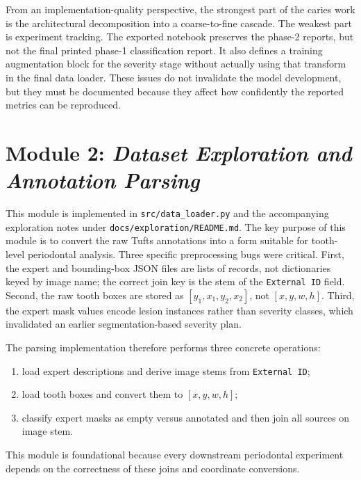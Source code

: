 From an implementation-quality perspective, the strongest part of the caries
work is the architectural decomposition into a coarse-to-fine cascade. The
weakest part is experiment tracking. The exported notebook preserves the phase-2
reports, but not the final printed phase-1 classification report. It also
defines a training augmentation block for the severity stage without actually
using that transform in the final data loader. These issues do not invalidate
the model development, but they must be documented because they affect how
confidently the reported metrics can be reproduced.


\section{Module 2: \textit{Dataset Exploration and Annotation Parsing}}
\label{sec:impl-module2}

This module is implemented in \texttt{src/data\_loader.py} and the accompanying
exploration notes under \texttt{docs/exploration/README.md}. The key purpose of this
module is to convert the raw Tufts annotations into a form suitable for
tooth-level periodontal analysis. Three specific preprocessing bugs were
critical. First, the expert and bounding-box JSON files are lists of records,
not dictionaries keyed by image name; the correct join key is the stem of the
\texttt{External ID} field. Second, the raw tooth boxes are stored as
\([y_1, x_1, y_2, x_2]\), not \([x, y, w, h]\). Third, the expert mask values
encode lesion instances rather than severity classes, which invalidated an
earlier segmentation-based severity plan.

The parsing implementation therefore performs three concrete operations:
\begin{enumerate}
  \item load expert descriptions and derive image stems from \texttt{External ID};
  \item load tooth boxes and convert them to \([x, y, w, h]\);
  \item classify expert masks as empty versus annotated and then join all
  sources on image stem.
\end{enumerate}
This module is foundational because every downstream periodontal experiment
depends on the correctness of these joins and coordinate conversions.

